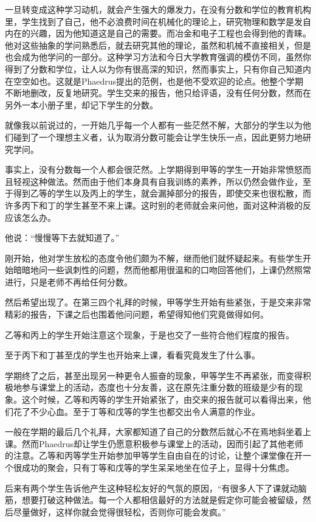 \documentclass[UTF8]{article}
\begin{document}
\par 一旦转变成这种学习动机，就会产生强大的爆发力，在没有分数和学位的教育机构里，学生找到了自己，他不必浪费时间在机械化的理论上，研究物理和数学是发自内在的兴趣，因为他知道这是自己的需要。而冶金和电子工程也会得到他的青睐。他对这些抽象的学问熟悉后，就去研究其他的理论，虽然和机械不直接相关，但是也会成为他学问的一部分。这种学习方法和今日大学教育强调的模仿不同，虽然你得到了分数和学位，让人以为你有很高深的知识，然而事实上，只有你自己知道内在空空如也。这就是Phaedrus提出的范例，也是他不受欢迎的论点。他整个学期不断地删改，反复地研究。学生交来的报告，他只给评语，没有任何分数，然而在另外一本小册子里，却记下学生的分数。
\par 就像我以前说过的，一开始几乎每一个人都有一些茫然不解，大部分的学生以为他们碰到了一个理想主义者，认为取消分数可能会让学生快乐一点，因此更努力地研究学问。
\par 事实上，没有分数每一个人都会很茫然。上学期得到甲等的学生一开始非常愤怒而且轻视这种做法。然而由于他们本身具有自我训练的素养，所以仍然会做作业，至于得到乙等的学生以及丙上的学生，就会漏掉部分的报告，即使交来也很松散，而许多丙下和丁的学生甚至不来上课。这时别的老师就会来问他，面对这种消极的反应该怎么办。
\par 他说：“慢慢等下去就知道了。”
\par 刚开始，他对学生放松的态度令他们颇为不解，继而他们就怀疑起来。有些学生开始暗暗地问一些讽刺性的问题，然而他都用很温和的口吻回答他们，上课仍然照常进行，只是老师不再给任何分数。
\par 然后希望出现了。在第三四个礼拜的时候，甲等学生开始有些紧张，于是交来非常精彩的报告，下课之后也围着他问问题，希望得知他们究竟做得如何。
\par 乙等和丙上的学生开始注意这个现象，于是也交了一些符合他们程度的报告。
\par 至于丙下和丁甚至戊的学生也开始来上课，看看究竟发生了什么事。
\par 学期终了之后，甚至出现另一种更令人振奋的现象，甲等学生不再紧张，而变得积极地参与课堂上的活动，态度也十分友善，这在原先注重分数的班级是少有的现象。这个时候，乙等和丙等的学生开始紧张了，由交来的报告就可以看得出来，他们花了不少心血。至于丁等和戊等的学生也都交出令人满意的作业。
\par 一般在学期的最后几个礼拜，大家都知道了自己的分数然后就心不在焉地斜坐着上课。然而Phaedrus却让学生仍愿意积极参与课堂上的活动，因而引起了其他老师的注意。乙等和丙等学生开始参加甲等学生自由自在的讨论，让整个课堂像在开一个很成功的聚会，只有丁等和戊等的学生呆呆地坐在位子上，显得十分焦虑。
\par 后来有两个学生告诉他产生这种轻松友好的气氛的原因，“有很多人下了课就动脑筋，想要打破这种做法。每一个人都相信最好的方法就是假定你可能会被留级，然后尽量做好，这样你就会觉得很轻松，否则你可能会发疯。”
\end{document}

